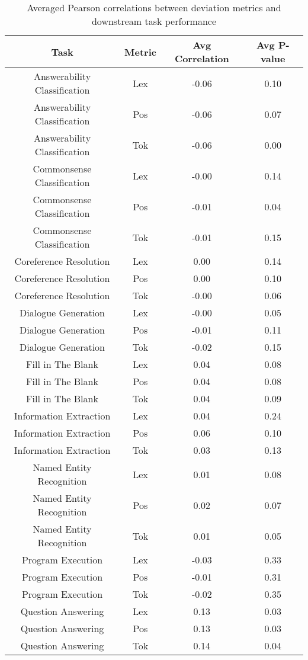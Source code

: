\begin{table}
\caption{Averaged Pearson correlations between deviation metrics and downstream task performance}
\begin{tabular}{cccc}
\toprule
Task & Metric & Avg Correlation & Avg P-value \\
\midrule
Answerability Classification & Lex & -0.06 & 0.10 \\
Answerability Classification & Pos & -0.06 & 0.07 \\
Answerability Classification & Tok & -0.06 & 0.00 \\
Commonsense Classification & Lex & -0.00 & 0.14 \\
Commonsense Classification & Pos & -0.01 & 0.04 \\
Commonsense Classification & Tok & -0.01 & 0.15 \\
Coreference Resolution & Lex & 0.00 & 0.14 \\
Coreference Resolution & Pos & 0.00 & 0.10 \\
Coreference Resolution & Tok & -0.00 & 0.06 \\
Dialogue Generation & Lex & -0.00 & 0.05 \\
Dialogue Generation & Pos & -0.01 & 0.11 \\
Dialogue Generation & Tok & -0.02 & 0.15 \\
Fill in The Blank & Lex & 0.04 & 0.08 \\
Fill in The Blank & Pos & 0.04 & 0.08 \\
Fill in The Blank & Tok & 0.04 & 0.09 \\
Information Extraction & Lex & 0.04 & 0.24 \\
Information Extraction & Pos & 0.06 & 0.10 \\
Information Extraction & Tok & 0.03 & 0.13 \\
Named Entity Recognition & Lex & 0.01 & 0.08 \\
Named Entity Recognition & Pos & 0.02 & 0.07 \\
Named Entity Recognition & Tok & 0.01 & 0.05 \\
Program Execution & Lex & -0.03 & 0.33 \\
Program Execution & Pos & -0.01 & 0.31 \\
Program Execution & Tok & -0.02 & 0.35 \\
Question Answering & Lex & 0.13 & 0.03 \\
Question Answering & Pos & 0.13 & 0.03 \\
Question Answering & Tok & 0.14 & 0.04 \\

\end{tabular}
\end{table}
